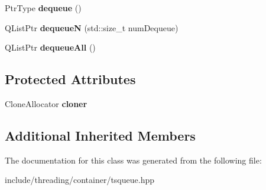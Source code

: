 \begin{DoxyCompactItemize}
\item 
\hypertarget{classcore_1_1threading_1_1container_1_1_t_s_queue_a4de625130dda74c584b5942e3a2d0759}{Ptr\-Type {\bfseries dequeue} ()}\label{classcore_1_1threading_1_1container_1_1_t_s_queue_a4de625130dda74c584b5942e3a2d0759}

\item 
\hypertarget{classcore_1_1threading_1_1container_1_1_t_s_queue_add25b47f1a79fbe13d9315aa13651ab2}{Q\-List\-Ptr {\bfseries dequeue\-N} (std\-::size\-\_\-t num\-Dequeue)}\label{classcore_1_1threading_1_1container_1_1_t_s_queue_add25b47f1a79fbe13d9315aa13651ab2}

\item 
\hypertarget{classcore_1_1threading_1_1container_1_1_t_s_queue_afa31b4ea2e91d025d1f8936bf7675f04}{Q\-List\-Ptr {\bfseries dequeue\-All} ()}\label{classcore_1_1threading_1_1container_1_1_t_s_queue_afa31b4ea2e91d025d1f8936bf7675f04}

\end{DoxyCompactItemize}
\subsection*{Protected Attributes}
\begin{DoxyCompactItemize}
\item 
\hypertarget{classcore_1_1threading_1_1container_1_1_t_s_queue_ac6403446dbc5d11cbec3ae53f808d555}{Clone\-Allocator {\bfseries cloner}}\label{classcore_1_1threading_1_1container_1_1_t_s_queue_ac6403446dbc5d11cbec3ae53f808d555}

\end{DoxyCompactItemize}
\subsection*{Additional Inherited Members}


The documentation for this class was generated from the following file\-:\begin{DoxyCompactItemize}
\item 
include/threading/container/tsqueue.\-hpp\end{DoxyCompactItemize}
